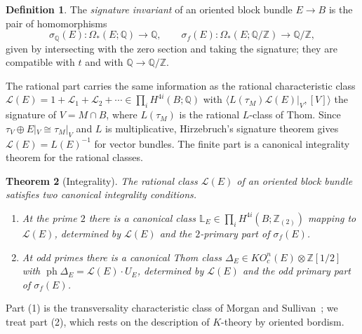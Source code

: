 \documentclass[11pt]{amsart}
\theoremstyle{plain}
\newtheorem{theorem}{Theorem}[section]
\theoremstyle{definition}
\newtheorem{definition}[theorem]{Definition}
\numberwithin{equation}{section}
\newcommand{\Z}{\mathbb{Z}}
\newcommand{\Q}{\mathbb{Q}}
\newcommand{\KO}{\mathit{KO}}
\DeclareMathOperator{\ph}{ph}
\begin{document}
\begin{definition}
The \emph{signature invariant} of an oriented block bundle $E\to B$ is the pair of homomorphisms
\[
\sigma_\Q(E)\colon\Omega_*(E;\Q)\to\Q,\qquad\sigma_f(E)\colon\Omega_*(E;\Q/\Z)\to\Q/\Z,
\]
given by intersecting with the zero section and taking the signature; they are compatible with $t$ and with $\Q\to\Q/\Z$.
\end{definition}

The rational part carries the same information as the rational characteristic class $\mathcal L(E)=1+\mathcal L_1+\mathcal L_2+\cdots\in\prod_iH^{4i}(B;\Q)$ with $\langle L(\tau_M)\mathcal L(E)|_V,[V]\rangle$ the signature of $V=M\cap B$, where $L(\tau_M)$ is the rational $L$-class of Thom.
Since $\tau_V\oplus E|_V\cong\tau_M|_V$ and $L$ is multiplicative, Hirzebruch's signature theorem gives $\mathcal L(E)=L(E)^{-1}$ for vector bundles.
The finite part is a canonical integrality theorem for the rational classes.

\begin{theorem}[Integrality]\label{thm:integrality}
The rational class $\mathcal L(E)$ of an oriented block bundle satisfies two canonical integrality conditions.
\begin{enumerate}[label=\textup{(\arabic*)}]
\item At the prime $2$ there is a canonical class $\mathbb L_E\in\prod_iH^{4i}(B;\Z_{(2)})$ mapping to $\mathcal L(E)$, determined by $\mathcal L(E)$ and the $2$-primary part of $\sigma_f(E)$.
\item At odd primes there is a canonical Thom class $\Delta_E\in\KO^n_c(E)\otimes\Z[1/2]$ with $\ph\Delta_E=\mathcal L(E)\cdot U_E$, determined by $\mathcal L(E)$ and the odd primary part of $\sigma_f(E)$.
\end{enumerate}
\end{theorem}

Part (1) is the transversality characteristic class of Morgan and Sullivan~\cite{MS74}; we treat part (2), which rests on the description of $K$-theory by oriented bordism.
\end{document}
